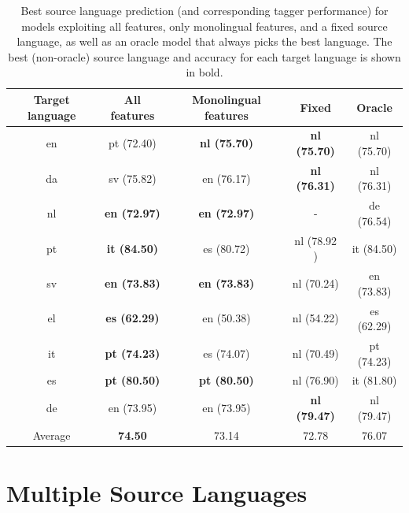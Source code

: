 \begin{table}
\small
\centering
    \begin{tabular}{cccc|c}
    Target language & All features & Monolingual features & Fixed& Oracle\\\hline
    en              & pt (72.40)          & \textbf{nl (75.70)} & \textbf{nl (75.70)}& nl (75.70) \\ 
    da              & sv  (75.82)          & en (76.17)  & \textbf{nl (76.31)} &  nl (76.31)\\
    nl              & \textbf{en  (72.97)}              & \textbf{en (72.97)}&  - & de (76.54)\\
    pt              & \textbf{it  (84.50)}           & es (80.72)& nl (78.92
) & it (84.50)\\
    sv              & \textbf{en  (73.83)}               & \textbf{en (73.83)} & nl (70.24) & en (73.83)\\
    el              & \textbf{es  (62.29)}            & en (50.38)& nl (54.22) & es  (62.29) \\
    it              & \textbf{pt  (74.23)}          & es (74.07) & nl (70.49) & pt  (74.23) \\
    es              & \textbf{pt   (80.50)}          & \textbf{pt (80.50)}  & nl (76.90) & it (81.80)\\
    de              & en  (73.95)         & en (73.95)  & \textbf{nl (79.47)} & nl (79.47)\\ \hline
    Average         & \textbf{ \phantom{xx (}74.50\phantom{)} }     & \phantom{xx (}73.14\phantom{)}& \phantom{xx (}72.78\phantom{)} & \phantom{xx (}76.07\phantom{)}
    \end{tabular}
    \caption{Best source language prediction (and corresponding tagger performance) for models exploiting all features, only monolingual features, and a fixed source language, as well as an oracle model that always picks the best language. The best (non-oracle) source language and accuracy for each target language is shown in bold.}
    \label{tbl:sourceLangPrediction}
\end{table}

\section{Multiple Source Languages}
\label{sec:multipleSourceLanguages}


